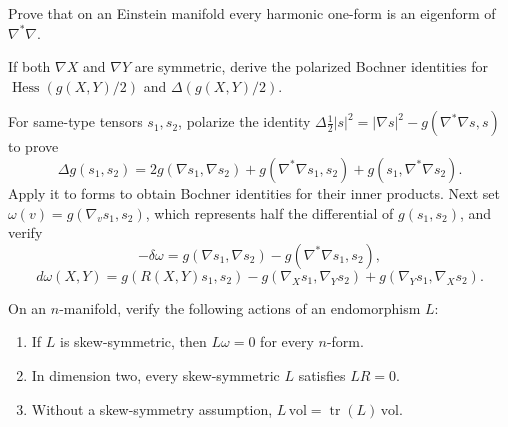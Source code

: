 \begin{remark}
  \label{rem:pet-ch9-exercise-9-6-7}
  Prove that on an Einstein manifold every harmonic one-form is an eigenform
  of $\nabla^*\nabla$.
\end{remark}

\begin{remark}
  \label{rem:pet-ch9-exercise-9-6-8}
  If both $\nabla X$ and $\nabla Y$ are symmetric, derive the polarized
  Bochner identities for
  $\operatorname{Hess}(g(X,Y)/2)$ and $\Delta(g(X,Y)/2)$.
\end{remark}

\begin{remark}
  \label{rem:pet-ch9-exercise-9-6-9}
  For same-type tensors $s_1,s_2$, polarize the identity
  $\Delta\tfrac12|s|^2=|\nabla s|^2-g(\nabla^*\nabla s,s)$ to prove
  \[
    \Delta g(s_1,s_2)=2g(\nabla s_1,\nabla s_2)+g(\nabla^*\nabla s_1,s_2)
    +g(s_1,\nabla^*\nabla s_2).
  \]
  Apply it to forms to obtain Bochner identities for their inner products.
  Next set $\omega(v)=g(\nabla_vs_1,s_2)$, which represents half the
  differential of $g(s_1,s_2)$, and verify
  \[
    -\delta\omega=g(\nabla s_1,\nabla s_2)-g(\nabla^*\nabla s_1,s_2),
  \]
  \[
    d\omega(X,Y)=g(R(X,Y)s_1,s_2)-g(\nabla_Xs_1,\nabla_Ys_2)+g(\nabla_Ys_1,\nabla_Xs_2).
  \]
\end{remark}

\begin{remark}
  \label{rem:pet-ch9-exercise-9-6-10}
  On an $n$-manifold, verify the following actions of an endomorphism $L$:
  \begin{enumerate}
    \item[(1)] If $L$ is skew-symmetric, then $L\omega=0$ for every $n$-form.
    \item[(2)] In dimension two, every skew-symmetric $L$ satisfies $LR=0$.
    \item[(3)] Without a skew-symmetry assumption,
      $L\,\mathrm{vol}=\operatorname{tr}(L)\,\mathrm{vol}$.
  \end{enumerate}
\end{remark}

